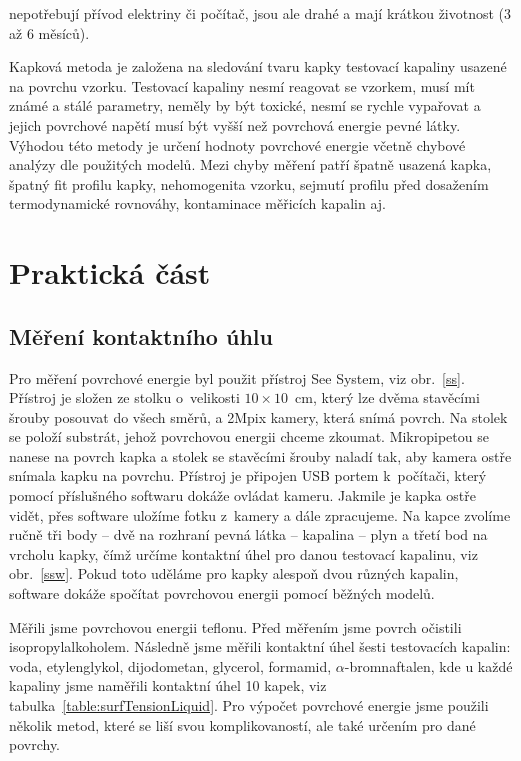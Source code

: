 \documentclass{protokol}
\begin{document}
nepotřebují přívod elektriny či počítač, jsou ale drahé a mají krátkou 
životnost (3 až 6 měsíců).
\par Kapková metoda je založena na sledování tvaru kapky testovací kapaliny 
usazené na povrchu vzorku. Testovací kapaliny nesmí reagovat se vzorkem, musí 
mít známé a stálé parametry, neměly by být toxické, nesmí se rychle vypařovat a 
jejich povrchové napětí musí být vyšší než povrchová energie pevné látky. 
Výhodou této metody je určení hodnoty povrchové energie včetně chybové analýzy 
dle použitých modelů. Mezi chyby měření patří špatně usazená kapka, špatný fit 
profilu kapky, nehomogenita vzorku, sejmutí profilu před dosažením 
termodynamické rovnováhy, kontaminace měřicích kapalin aj.

\section{Praktická část}
\subsection{Měření kontaktního úhlu}
\par Pro měření povrchové energie byl použit přístroj See System, viz 
obr.~\ref{ss}. Přístroj je složen ze stolku o~velikosti $10 \times 10$~cm, 
který lze dvěma stavěcími šrouby posouvat do všech směrů, a 2Mpix kamery, která 
snímá povrch. Na stolek se položí substrát, jehož povrchovou energii chceme 
zkoumat. Mikropipetou se nanese na povrch kapka a stolek se stavěcími šrouby 
naladí tak, aby kamera ostře snímala kapku na povrchu. Přístroj je připojen USB 
portem k~počítači, který pomocí příslušného softwaru dokáže ovládat kameru. 
Jakmile je kapka ostře vidět, přes software uložíme fotku z~kamery a dále 
zpracujeme. Na kapce zvolíme ručně tři body -- dvě na rozhraní pevná látka -- 
kapalina -- plyn a třetí bod na vrcholu kapky, čímž určíme kontaktní úhel pro 
danou testovací kapalinu, viz obr.~\ref{ssw}. Pokud toto uděláme pro kapky 
alespoň dvou různých kapalin, software dokáže spočítat povrchovou energii 
pomocí běžných modelů. 
\par Měřili jsme povrchovou energii teflonu. Před měřením jsme povrch očistili 
isopropylalkoholem. Následně jsme měřili kontaktní úhel šesti testovacích 
kapalin: voda, etylenglykol, dijodometan, glycerol, formamid, 
$\alpha$-bromnaftalen, kde u každé kapaliny jsme naměřili kontaktní úhel 10 
kapek, viz tabulka~\ref{table:surfTensionLiquid}. Pro výpočet povrchové 
energie jsme použili několik metod, které se liší svou komplikovaností, ale 
také určením pro dané povrchy.
\end{document}
